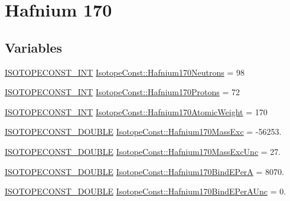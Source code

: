 \hypertarget{group___isotope_const-_hafnium-_hf170}{}\section{Hafnium 170}
\label{group___isotope_const-_hafnium-_hf170}
\subsection*{Variables}
\begin{DoxyCompactItemize}
\item 
\mbox{\hyperlink{group___isotope_const-_macros_ga5f18360b3e99483a35c32d789e62621c}{I\+S\+O\+T\+O\+P\+E\+C\+O\+N\+S\+T\+\_\+\+I\+NT}} \mbox{\hyperlink{group___isotope_const-_hafnium-_hf170_ga2c8ed479e75a210b0cf9811248fdae8f}{Isotope\+Const\+::\+Hafnium170\+Neutrons}} = 98
\item 
\mbox{\hyperlink{group___isotope_const-_macros_ga5f18360b3e99483a35c32d789e62621c}{I\+S\+O\+T\+O\+P\+E\+C\+O\+N\+S\+T\+\_\+\+I\+NT}} \mbox{\hyperlink{group___isotope_const-_hafnium-_hf170_gad8ae69cde3f0750c2e19a1d4aeb2bda0}{Isotope\+Const\+::\+Hafnium170\+Protons}} = 72
\item 
\mbox{\hyperlink{group___isotope_const-_macros_ga5f18360b3e99483a35c32d789e62621c}{I\+S\+O\+T\+O\+P\+E\+C\+O\+N\+S\+T\+\_\+\+I\+NT}} \mbox{\hyperlink{group___isotope_const-_hafnium-_hf170_ga9860aae7b3de75bd7301a3aa19ca14a9}{Isotope\+Const\+::\+Hafnium170\+Atomic\+Weight}} = 170
\item 
\mbox{\hyperlink{group___isotope_const-_macros_ga8f45a7272ce02c0b4c65c44636ed719a}{I\+S\+O\+T\+O\+P\+E\+C\+O\+N\+S\+T\+\_\+\+D\+O\+U\+B\+LE}} \mbox{\hyperlink{group___isotope_const-_hafnium-_hf170_gaf59881b02aebee60b1afd27ae2f39992}{Isotope\+Const\+::\+Hafnium170\+Mass\+Exc}} = -\/56253.
\item 
\mbox{\hyperlink{group___isotope_const-_macros_ga8f45a7272ce02c0b4c65c44636ed719a}{I\+S\+O\+T\+O\+P\+E\+C\+O\+N\+S\+T\+\_\+\+D\+O\+U\+B\+LE}} \mbox{\hyperlink{group___isotope_const-_hafnium-_hf170_ga95705977bef445e15e6e9c0714a874b4}{Isotope\+Const\+::\+Hafnium170\+Mass\+Exc\+Unc}} = 27.
\item 
\mbox{\hyperlink{group___isotope_const-_macros_ga8f45a7272ce02c0b4c65c44636ed719a}{I\+S\+O\+T\+O\+P\+E\+C\+O\+N\+S\+T\+\_\+\+D\+O\+U\+B\+LE}} \mbox{\hyperlink{group___isotope_const-_hafnium-_hf170_ga41c9295757fe3b709464accb75fadd48}{Isotope\+Const\+::\+Hafnium170\+Bind\+E\+PerA}} = 8070.
\item 
\mbox{\hyperlink{group___isotope_const-_macros_ga8f45a7272ce02c0b4c65c44636ed719a}{I\+S\+O\+T\+O\+P\+E\+C\+O\+N\+S\+T\+\_\+\+D\+O\+U\+B\+LE}} \mbox{\hyperlink{group___isotope_const-_hafnium-_hf170_gaeba9146a4c99b4fb92b4ba552238decd}{Isotope\+Const\+::\+Hafnium170\+Bind\+E\+Per\+A\+Unc}} = 0.

\end{DoxyCompactItemize}
